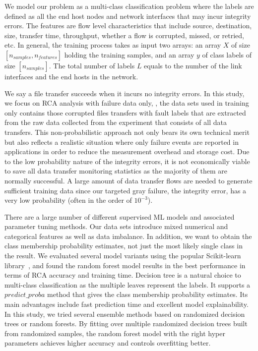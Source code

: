 We model our problem as a multi-class classification problem where the labels are defined as all the end host nodes and network interfaces that may incur integrity errors. 
The features are flow level characteristics that include source, destination, size, transfer time, throughput, whether a flow is corrupted, missed, or retried, etc. In general, the training process takes 
as input two arrays: an array $X$ of size $[n_{samples}, n_{features}]$ holding the training samples, and an array $y$ of class labels of size $[n_{samples}]$. 
The total number of labels $L$ equals to the number of the link interfaces and the end hosts in the network. 

We say a file transfer succeeds when it incurs no integrity errors. In this study, we focus on RCA analysis with failure data only, \ie, the data sets used in training only contains those corrupted files transfers with fault labels that are extracted from the raw data collected from the experiment that consists of all data transfers. This non-probabilistic approach not only bears its own technical merit but also reflects a realistic situation where only failure events are reported in applications in order to reduce the measurement overhead and storage cost. Due to the low probability nature of the integrity errors, it is not economically viable to save all data transfer monitoring statistics as the majority of them are normally successful.  A large amount of data transfer flows are needed to generate sufficient training data since our targeted gray failure, the integrity error, has a very low probability (often in the order of $10^{-3}$).

There are a large number of different supervised ML models and associated parameter tuning  methods. Our data sets introduce mixed numerical and categorical features as well as data imbalance. 
In addition, we want to obtain the class membership probability estimates, not just the most likely single class in the result. We evaluated several model variants using the popular Scikit-learn library~\cite{Scikit:web},  
and found the random forest model results in the best performance in terms of RCA accuracy and training time. 
Decision tree is a natural choice to multi-class classification as the multiple leaves represent the labels. It supports a $predict\_proba$ method that gives the class membership probability estimates. 
Its main advantages include fast prediction time and excellent model explainability. In this study, we tried several ensemble methods based on randomized decision trees or random forests. 
By fitting over multiple randomized decision trees built from randomized samples, the random forest model with the right hyper parameters achieves higher accuracy and controls overfitting better. 

